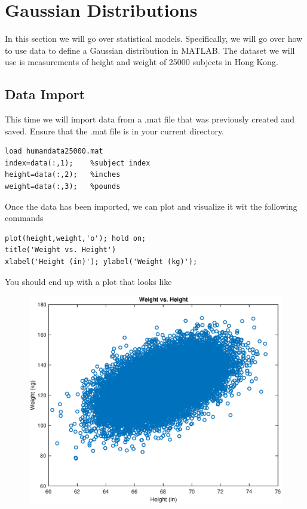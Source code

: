 \documentclass[12pt]{article}
\begin{document}
\newpage

\section{Gaussian Distributions}

In this section we will go over statistical models. Specifically, we will go over how to use data to define a Gaussian distribution in MATLAB. The dataset we will use is measurements of height and weight of 25000 subjects in Hong Kong\cite{leung_weight-for-age_1996}. 

\subsection{Data Import}

This time we will import data from a .mat file that was previously created and saved. Ensure that the .mat file is in your current directory. 

\begin{lstlisting}[frame=single]
load humandata25000.mat
index=data(:,1);    %subject index
height=data(:,2);   %inches 
weight=data(:,3);   %pounds
\end{lstlisting}

Once the data has been imported, we can plot and visualize it wit the following commands

\begin{lstlisting}[frame=single]
plot(height,weight,'o'); hold on;
title('Weight vs. Height')
xlabel('Height (in)'); ylabel('Weight (kg)');
\end{lstlisting}

You should end up with a plot that looks like

\begin{figure}[H]
\centering
\includegraphics[width=0.75\linewidth]{plotHeightWeight.eps}
\end{figure}
\end{document}
